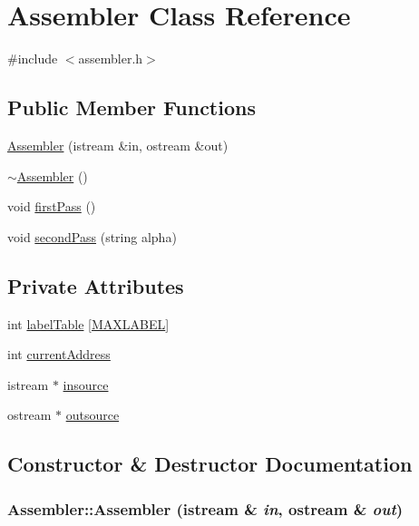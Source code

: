 \hypertarget{classAssembler}{
\section{Assembler Class Reference}
\label{classAssembler}
}


{\ttfamily \#include $<$assembler.h$>$}

\subsection*{Public Member Functions}
\begin{DoxyCompactItemize}
\item 
\hyperlink{classAssembler_ae13aed6c88a1c85b32d04286ae3f3f99}{Assembler} (istream \&in, ostream \&out)
\item 
\hyperlink{classAssembler_a6e9d207baf8191cd6c4847f56548f73f}{$\sim$Assembler} ()
\item 
void \hyperlink{classAssembler_a2896bf358b7ae6c53bcc887f48cf52f3}{firstPass} ()
\item 
void \hyperlink{classAssembler_ac9bc248b0687b5cf6aaf275255d1f808}{secondPass} (string alpha)
\end{DoxyCompactItemize}
\subsection*{Private Attributes}
\begin{DoxyCompactItemize}
\item 
int \hyperlink{classAssembler_ad5862739b31da3c3f85afa2dc9b17fe0}{labelTable} \mbox{[}\hyperlink{assembler_8h_a6673a3ae56c5fd5f06ee28fab9693c33}{MAXLABEL}\mbox{]}
\item 
int \hyperlink{classAssembler_a645f96a3abf12b17bdbbd3b9a20063f5}{currentAddress}
\item 
istream $\ast$ \hyperlink{classAssembler_a1b03f0d4cb3021f7415cb7cd0c20d4fe}{insource}
\item 
ostream $\ast$ \hyperlink{classAssembler_a5fc343ff2abfae56309dcd696d9e5295}{outsource}
\end{DoxyCompactItemize}


\subsection{Constructor \& Destructor Documentation}
\hypertarget{classAssembler_ae13aed6c88a1c85b32d04286ae3f3f99}{
\subsubsection[{Assembler}]{\setlength{\rightskip}{0pt plus 5cm}Assembler::Assembler (istream \& {\em in}, \/  ostream \& {\em out})}}
\label{classAssembler_ae13aed6c88a1c85b32d04286ae3f3f99}


